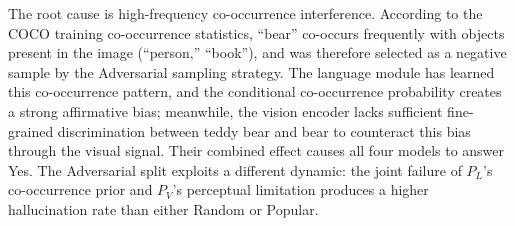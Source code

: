 The root cause is high-frequency co-occurrence interference.
According to the COCO training co-occurrence statistics,
``bear'' co-occurs frequently
with objects present in the image (``person,'' ``book''),
and was therefore selected as a negative sample
by the Adversarial sampling strategy.
The language module has learned this co-occurrence pattern,
and the conditional co-occurrence probability
creates a strong affirmative bias;
meanwhile, the vision encoder lacks sufficient fine-grained discrimination
between teddy bear and bear
to counteract this bias through the visual signal.
Their combined effect causes all four models to answer Yes.
The Adversarial split exploits a different dynamic:
the joint failure of $P_L$'s co-occurrence prior
and $P_V$'s perceptual limitation
produces a higher hallucination rate
than either Random or Popular.
